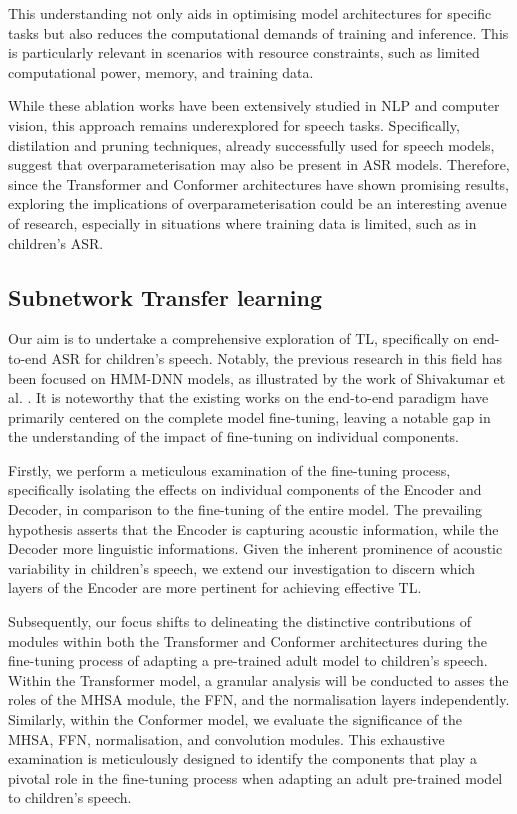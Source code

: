 This understanding not only aids in optimising model architectures for specific tasks but also reduces the computational demands of training and inference. This is particularly relevant in scenarios with resource constraints, such as limited computational power, memory, and training data.

While these ablation works have been extensively studied in NLP and computer vision, this approach remains underexplored for speech tasks. Specifically, distilation and pruning techniques, already successfully used for speech models, suggest that overparameterisation may also be present in ASR models. Therefore, since the Transformer and Conformer architectures have shown promising results, exploring the implications of overparameterisation could be an interesting avenue of research, especially in situations where training data is limited, such as in children's ASR.


\subsection{Subnetwork Transfer learning}
Our aim is to undertake a comprehensive exploration of TL, specifically on end-to-end ASR for children's speech. Notably, the previous research in this field has been focused on HMM-DNN models, as illustrated by the work of Shivakumar et al. \cite{shivakumar2020transfer}. It is noteworthy that the existing works on the end-to-end paradigm have primarily centered on the complete model fine-tuning, leaving a notable gap in the understanding of the impact of fine-tuning on individual components.

Firstly, we perform a meticulous examination of the fine-tuning process, specifically isolating the effects on individual components of the Encoder and Decoder, in comparison to the fine-tuning of the entire model. The prevailing hypothesis asserts that the Encoder is  capturing acoustic information, while the Decoder more linguistic informations. Given the inherent prominence of acoustic variability in children's speech, we extend our investigation to discern which layers of the Encoder are more pertinent for achieving effective TL.

Subsequently, our focus shifts to delineating the distinctive contributions of modules within both the Transformer and Conformer architectures during the fine-tuning process of adapting a pre-trained adult model to children's speech. Within the Transformer model, a granular analysis will be conducted to asses the roles of the MHSA module, the FFN, and the normalisation layers independently. Similarly, within the Conformer model, we evaluate the significance of the MHSA, FFN, normalisation, and convolution modules. This exhaustive examination is meticulously designed to identify the components that play a pivotal role in the fine-tuning process when adapting an adult pre-trained model to children's speech.


